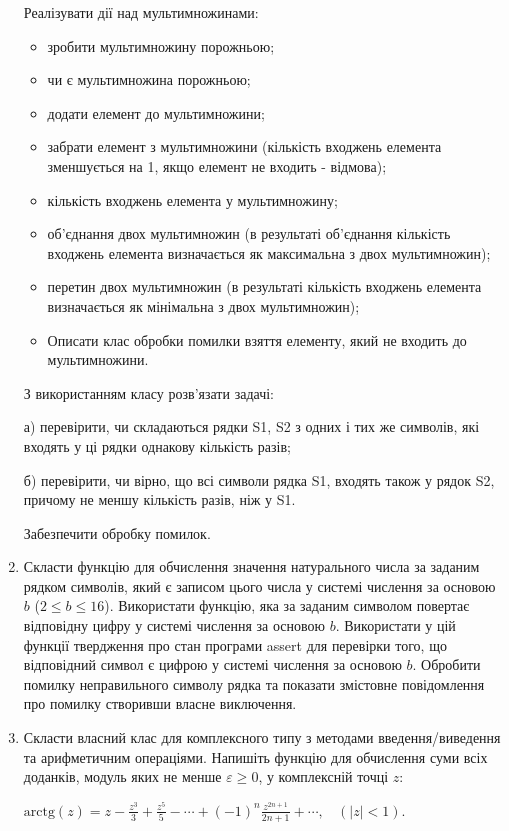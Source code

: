 \documentclass[]{article}
\begin{document}
\begin{enumerate}
Реалізувати дії над мультимножинами:
\begin{itemize}
\item
зробити мультимножину порожньою;
\item
чи є мультимножина порожньою;
\item
додати елемент до мультимножини;
\item
забрати елемент з мультимножини (кількість входжень елемента зменшується
на 1, якщо елемент не входить - відмова);
\item
кількість входжень елемента у мультимножину;
\item
об'єднання двох мультимножин (в результаті об'єднання кількість входжень
елемента визначається як максимальна з двох мультимножин);
\item
перетин двох мультимножин (в результаті кількість входжень елемента
визначається як мінімальна з двох мультимножин);
\item
Описати клас обробки помилки взяття елементу, який не входить до
мультимножини.
\end{itemize}
З використанням класу розв'язати задачі:

а) перевірити, чи складаються рядки S1, S2 з одних і тих же символів,
які входять у ці рядки однакову кількість разів;

б) перевірити, чи вірно, що всі символи рядка S1, входять також у рядок
S2, причому не меншу кількість разів, ніж у S1.

Забезпечити обробку помилок.

\item
  Скласти функцію для обчислення значення натурального числа за заданим
  рядком символів, який є записом цього числа у системі числення за
  основою \(b\) (\(2 \leq b \leq 16\)). Використати функцію, яка за
  заданим символом повертає відповідну цифру у системі числення за
  основою \(b\). Використати у цій функції твердження про стан програми
  assert для перевірки того, що відповідний символ є цифрою у системі
  числення за основою \(b\). Обробити помилку неправильного символу
  рядка та показати змістовне повідомлення про помилку створивши власне
  виключення.
\item
  Скласти власний клас для комплексного типу з методами
  введення/виведення та арифметичним операціями. Напишіть функцію для
  обчислення суми всіх доданків, модуль яких не менше
  \(\varepsilon \geq 0\), у комплексній точці \(z\):

  \(\text{arctg}\left( z \right) = z - \frac{z^{3}}{3} + \frac{z^{5}}{5} - \cdots + {( - 1)}^{n}\frac{z^{2n + 1}}{2n + 1} + \cdots,\ \ \ \ (\left| z \right| < 1)\).


\end{enumerate}
\end{document}
